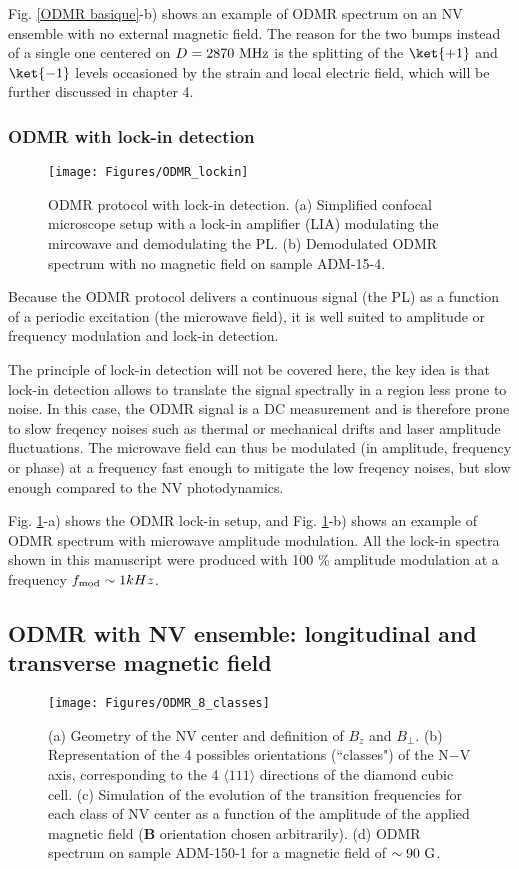 \documentclass[a4paper,11pt]{report}
\begin{document}
Fig. \ref{ODMR basique}-b) shows an example of ODMR spectrum on an NV ensemble with no external magnetic field. The reason for the two bumps instead of a single one centered on $D=2870\ \rm MHz$ is the splitting of the $\ket{+1}$ and $\ket{-1}$ levels occasioned by the strain and local electric field, which will be further discussed in chapter 4.

\subsubsection{ODMR with lock-in detection}
\begin{figure}[h!]
\centering
\texttt{[image: Figures/ODMR\_lockin]}
\caption{ODMR protocol with lock-in detection. (a) Simplified confocal microscope setup with a lock-in amplifier (LIA) modulating the mircowave and demodulating the PL. (b) Demodulated ODMR spectrum with no magnetic field on sample ADM-15-4.}
\label{ODMR lockin}
\end{figure}


Because the ODMR protocol delivers a continuous signal (the PL) as a function of a periodic excitation (the microwave field), it is well suited to amplitude or frequency modulation and lock-in detection. 

The principle of lock-in detection will not be covered here, the key idea is that lock-in detection allows to translate the signal spectrally in a region less prone to noise. In this case, the ODMR signal is a DC measurement and is therefore prone to slow freqency noises such as thermal or mechanical drifts and laser amplitude fluctuations. The microwave field can thus be modulated (in amplitude, frequency or phase) at a frequency fast enough to mitigate the low freqency noises, but slow enough compared to the NV photodynamics. 

Fig. \ref{ODMR lockin}-a) shows the ODMR lock-in setup, and Fig. \ref{ODMR lockin}-b) shows an example of ODMR spectrum with microwave amplitude modulation. All the lock-in spectra shown in this manuscript were produced with 100 \% amplitude modulation at a frequency $f_{\rm mod} \sim 1 kHz$.

\subsection{ODMR with NV ensemble: longitudinal and transverse magnetic field}

\begin{figure}[h!]
\centering
\texttt{[image: Figures/ODMR\_8\_classes]}
\caption{(a) Geometry of the NV center and definition of $B_z$ and $B_\perp$. (b) Representation of the 4 possibles orientations (``classes") of the N$-$V axis, corresponding to the 4 $\langle 111 \rangle$ directions of the diamond cubic cell. (c) Simulation of the evolution of the transition frequencies for each class of NV center as a function of the amplitude of the applied magnetic field ($\textbf{B}$ orientation chosen arbitrarily). (d) ODMR spectrum on sample ADM-150-1 for a magnetic field of $\sim 90\ \rm G$.}
\label{ODMR 8 classes}
\end{figure}
\end{document}
